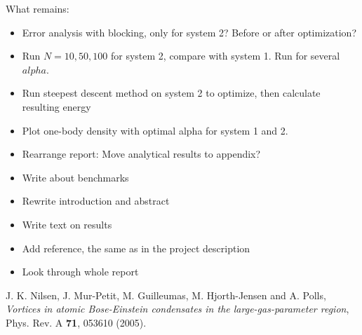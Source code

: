\documentclass[english, a4paper]{article}
\begin{document}
What remains:
\begin{itemize}
 \item Error analysis with blocking, only for system 2? Before or after optimization?
 \item Run $N = 10, 50, 100$ for system 2, compare with system 1. Run for several $alpha$.
 \item Run steepest descent method on system 2 to optimize, then calculate resulting energy
 \item Plot one-body density with optimal alpha for system 1 and 2. 
 \item Rearrange report: Move analytical results to appendix?
 \item Write about benchmarks
 \item Rewrite introduction and abstract
 \item Write text on results 
 \item Add reference, the same as in the project description
 \item Look through whole report
\end{itemize}




































 















\begin{thebibliography}{9}

  J. K. Nilsen, J. Mur-Petit, M. Guilleumas, M. Hjorth-Jensen and A. Polls, 
  \textit{Vortices in atomic Bose-Einstein condensates in the large-gas-parameter region}, 
  Phys. Rev. A {\bf 71}, 053610 (2005).

\end{thebibliography}
\end{document}

